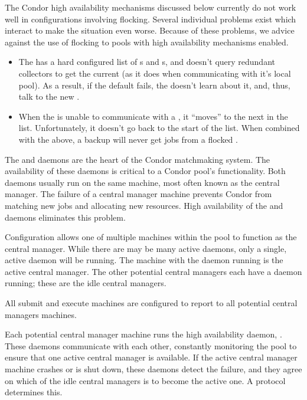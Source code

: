 \Note The Condor high availability mechanisms discussed below
currently do not work well in configurations involving flocking.
Several individual problems exist which interact to make the situation
even worse.  Because of these problems, we advice against the use of
flocking to pools with high availability mechanisms enabled.

\begin{itemize}
\item The  has a hard configured list of
s and s, and doesn't query
redundant collectors to get the current  (as it
does when communicating with it's local pool).  As a result, if the
default  fails, the  doesn't learn
about it, and, thus, talk to the new .

\item When the  is unable to communicate with a
, it ``moves'' to the next in the list.
Unfortunately, it doesn't go back to the start of the list.  When
combined with the above, a backup  will never get
jobs from a flocked .

\end{itemize}

The  and  daemons
are the heart of the Condor matchmaking system.
The availability of these daemons is critical to a Condor pool's
functionality.
Both daemons usually run on the same machine,
most often known as the central manager.
The failure of a central manager machine prevents Condor from matching
new jobs and allocating new resources.
High availability of the  and  daemons
eliminates this problem. 

Configuration allows one of
multiple machines within the pool to function as the central manager.
While there are may be many active  daemons,
only a single, active  daemon will be running.
The machine with the  daemon running is
the active central manager.
The other potential central managers each
have a  daemon running;
these are the idle central managers.

All submit and execute machines are configured to report
to all potential central managers machines.

Each potential central manager machine runs the high
availability daemon, .
These daemons communicate with each other,
constantly monitoring the pool to ensure that one active central
manager is available.
If the active central manager machine crashes or is shut down,
these daemons detect the failure,
and they agree on
which of the idle central managers is to become the active one.
A protocol determines this.

